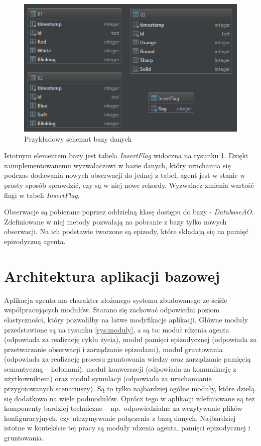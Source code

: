 \begin{figure}  
	\centering\includegraphics[width=.8\textwidth]{img/baza-schemat}
	\caption{Przykładowy schemat bazy danych \cite{raport}}
	\label{rys:baza}
\end{figure}

Istotnym elementem bazy jest tabela \textit{InsertFlag} widoczna na rysunku \ref{rys:baza}. Dzięki zaimplementowanemu wyzwalaczowi w bazie danych, który uruchamia się podczas dodawania nowych obserwacji do jednej z tabel, agent jest w stanie w prosty sposób sprawdzić, czy są w niej nowe rekordy. Wyzwalacz zmienia wartość flagi w tabeli \textit{InsertFlag}.

Obserwacje są pobierane poprzez oddzielną klasę dostępu do bazy - \textit{DatabaseAO}. Zdefiniowane w niej metody pozwalają na pobranie z bazy tylko nowych obserwacji. Na ich podstawie tworzone są epizody, które składają się na pamięć epizodyczną agenta.


\section{Architektura aplikacji bazowej}

Aplikacja agenta ma charakter złożonego systemu zbudowanego ze ściśle współpracujących modułów. Starano się zachować odpowiedni poziom elastyczności, który pozwoliłby na łatwe modyfikacje aplikacji. Główne moduły przedstawione są na rysunku \ref{rys:moduly}, a są to: moduł rdzenia agenta (odpowiada za realizację cyklu życia), moduł pamięci epizodycznej (odpowiada za przetwarzanie obserwacji i zarządzanie epizodami), moduł gruntowania (odpowiada za realizację procesu gruntowania wiedzy oraz zarządzanie pamięcią semantyczną -- holonami), moduł konwersacji (odpowiada za komunikację z użytkownikiem) oraz moduł symulacji (odpowiada za uruchamianie przygotowanych scenariuszy). Są to tylko najbardziej ogólne moduły, które dzielą się dodatkowo na wiele podmodułów. Oprócz tego w aplikacji zdefiniowane są też komponenty bardziej techniczne -- np.\ odpowiedzialne za wczytywanie plików konfiguracyjnych, czy utrzymywanie połączenia z bazą danych. Najbardziej istotne w kontekście tej pracy są moduły rdzenia agenta, pamięci epizodycznej i gruntowania. 

